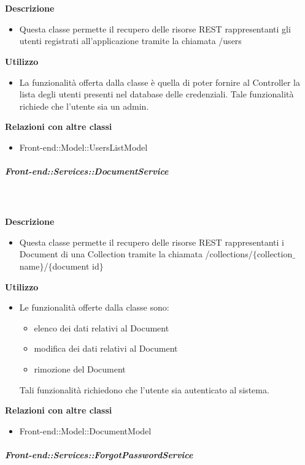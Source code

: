         \textbf{\\ \\ Descrizione} 
          \begin{itemize}
            \item[] Questa classe permette il recupero delle risorse REST rappresentanti gli utenti registrati all'applicazione tramite la chiamata /users
          \end{itemize}      
        \textbf{Utilizzo}  
          \begin{itemize}
            \item[] La funzionalità offerta dalla classe è quella di poter fornire al Controller la lista degli utenti presenti nel database delle credenziali.
Tale funzionalità richiede che l'utente sia un admin.
          \end{itemize}
          \textbf{Relazioni con altre classi}
          \begin{itemize}
              \item{Front-end::Model::UsersListModel}
          \end{itemize}
      \subparagraph{Front-end::Services::DocumentService}
        
        \textbf{\\ \\ Descrizione} 
          \begin{itemize}
            \item[] Questa classe permette il recupero delle risorse REST rappresentanti i Document di una Collection tramite la chiamata /collections/$\{$collection$\_$name$\}$/$\{$document id$\}$
          \end{itemize}      
        \textbf{Utilizzo}  
          \begin{itemize}
            \item[] Le funzionalità offerte dalla classe sono: 
\begin{itemize} 
\item elenco dei dati relativi al Document 
\item modifica dei dati relativi al Document
\item rimozione del Document 
\end{itemize} 
Tali funzionalità richiedono che l'utente sia autenticato al sistema.
          \end{itemize}
          \textbf{Relazioni con altre classi}
          \begin{itemize}
              \item{Front-end::Model::DocumentModel}
          \end{itemize}
      \subparagraph{Front-end::Services::ForgotPasswordService}
        
